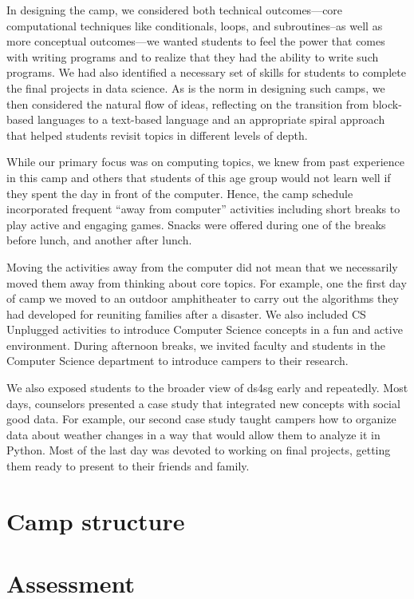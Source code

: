 In designing the camp, we considered both technical outcomes---core
computational techniques like conditionals, loops, and subroutines--as
well as more conceptual outcomes---we wanted students to feel the
power that comes with writing programs and to realize that they had
the ability to write such programs.  We had also identified a
necessary set of skills for students to complete the final projects
in data science.  As is the norm in designing such camps, we then
considered the natural flow of ideas, reflecting on the transition
from block-based languages to a text-based language and an appropriate
spiral approach that helped students revisit topics in different
levels of depth.

While our primary focus was on computing topics, we knew from past
experience in this camp and others that students of this age group
would not learn well if they spent the day in front of the computer.
Hence, the camp schedule incorporated frequent ``away from computer''
activities including short breaks to play active and engaging games.
Snacks were offered during one of the breaks before lunch, and
another after lunch.

Moving the activities away from the computer did not mean that we
necessarily moved them away from thinking about core topics.  For
example, one the first day of camp we moved to an outdoor amphitheater
to carry out the algorithms they had developed for reuniting families
after a disaster.  We also included CS Unplugged \cite{csunplugged}
activities to introduce Computer Science concepts in a fun and
active environment.  During afternoon breaks, we invited faculty
and students in the Computer Science department to introduce campers
to their research.  

We also exposed students to the broader view of ds4sg early and
repeatedly.  Most days, counselors presented a case study that
integrated new concepts with social good data. For example, our
second case study taught campers how to organize data about weather
changes in a way that would allow them to analyze it in Python.
Most of the last day was devoted to working on final projects,
getting them ready to present to their friends and family.

\section{Camp structure}

\section{Assessment}

